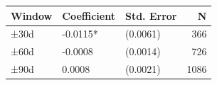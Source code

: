 \caption{MiCA — 7D_EWMA_Intraday_Price_Volatility 多窗口稳健性检验}
\begin{tabular}{lllr}
\toprule
Window & Coefficient & Std. Error & N \\
\midrule
±30d & -0.0115* & (0.0061) & 366 \\
±60d & -0.0008 & (0.0014) & 726 \\
±90d & 0.0008 & (0.0021) & 1086 \\
\bottomrule
\end{tabular}
